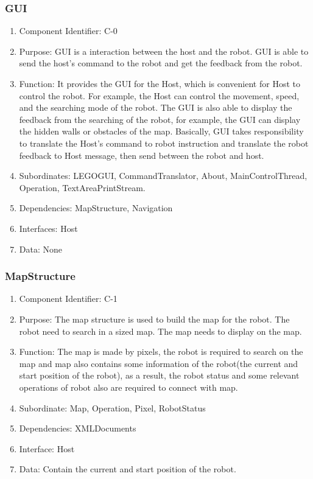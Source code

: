 \documentclass[11pt, a4paper]{report}
\begin{document}
\subsubsection{GUI}
\begin{enumerate}
\item Component Identifier: C-0
\item Purpose: GUI is a interaction between the host and the robot. GUI is able to send the host's command to the robot and get the feedback from the robot.  
\item Function: It provides the GUI for the Host, which is convenient for Host to control the robot. For example, the Host can control the movement, speed, and the searching mode of the robot. The GUI is also able to display the feedback from the searching of the robot, for example, the GUI can display the hidden walls or obstacles of the map. Basically, GUI takes responsibility to translate the Host's command to robot instruction and translate the robot feedback to Host message, then send between the robot and host.   
\item Subordinates: LEGOGUI, CommandTranslator, About, MainControlThread, Operation, TextAreaPrintStream. 
\item Dependencies: MapStructure, Navigation
\item Interfaces: Host
\item Data: None
\end{enumerate}

\subsubsection{MapStructure}
\begin{enumerate}
\item Component Identifier: C-1
\item Purpose: The map structure is used to build the map for the robot. The robot need to search in a sized map. The map needs to display on the map. 
\item Function: The map is made by pixels, the robot is required to search on the map and map also contains some information of the robot(the current and start position of the robot), as a result, the robot status and some relevant operations of robot also are required to connect with map.
\item Subordinate: Map, Operation, Pixel, RobotStatus
\item Dependencies: XMLDocuments
\item Interface: Host
\item Data: Contain the current and start position of the robot. 
\end{enumerate}
\end{document}
